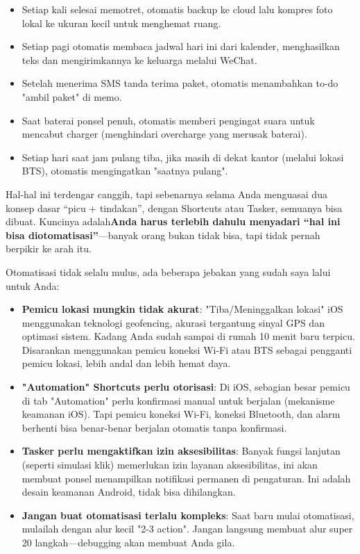 \begin{itemize}
  \item Setiap kali selesai memotret, otomatis backup ke cloud lalu kompres foto lokal ke ukuran kecil untuk menghemat ruang.
  \item Setiap pagi otomatis membaca jadwal hari ini dari kalender, menghasilkan teks dan mengirimkannya ke keluarga melalui WeChat.
  \item Setelah menerima SMS tanda terima paket, otomatis menambahkan to-do "ambil paket" di memo.
  \item Saat baterai ponsel penuh, otomatis memberi pengingat suara untuk mencabut charger (menghindari overcharge yang merusak baterai).
  \item Setiap hari saat jam pulang tiba, jika masih di dekat kantor (melalui lokasi BTS), otomatis mengingatkan "saatnya pulang".
\end{itemize}

Hal-hal ini terdengar canggih, tapi sebenarnya selama Anda menguasai dua konsep dasar “picu + tindakan”, dengan Shortcuts atau Tasker, semuanya bisa dibuat. Kuncinya adalah\textbf{Anda harus terlebih dahulu menyadari “hal ini bisa diotomatisasi”}—banyak orang bukan tidak bisa, tapi tidak pernah berpikir ke arah itu.


Otomatisasi tidak selalu mulus, ada beberapa jebakan yang sudah saya lalui untuk Anda:

\begin{itemize}
  \item \textbf{Pemicu lokasi mungkin tidak akurat}: "Tiba/Meninggalkan lokasi" iOS menggunakan teknologi geofencing, akurasi tergantung sinyal GPS dan optimasi sistem. Kadang Anda sudah sampai di rumah 10 menit baru terpicu. Disarankan menggunakan pemicu koneksi Wi-Fi atau BTS sebagai pengganti pemicu lokasi, lebih andal dan lebih hemat daya.
  \item \textbf{"Automation" Shortcuts perlu otorisasi}: Di iOS, sebagian besar pemicu di tab "Automation" perlu konfirmasi manual untuk berjalan (mekanisme keamanan iOS). Tapi pemicu koneksi Wi-Fi, koneksi Bluetooth, dan alarm berhenti bisa benar-benar berjalan otomatis tanpa konfirmasi.
  \item \textbf{Tasker perlu mengaktifkan izin aksesibilitas}: Banyak fungsi lanjutan (seperti simulasi klik) memerlukan izin layanan aksesibilitas, ini akan membuat ponsel menampilkan notifikasi permanen di pengaturan. Ini adalah desain keamanan Android, tidak bisa dihilangkan.
  \item \textbf{Jangan buat otomatisasi terlalu kompleks}: Saat baru mulai otomatisasi, mulailah dengan alur kecil "2-3 action". Jangan langsung membuat alur super 20 langkah—debugging akan membuat Anda gila.
\end{itemize}

